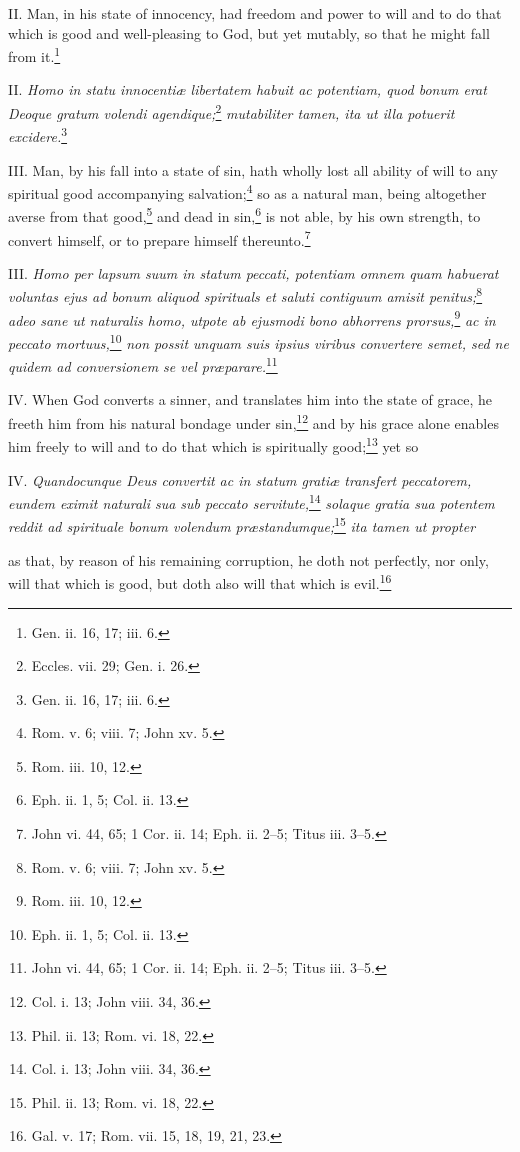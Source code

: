 II. Man, in his state of innocency, had freedom and power to will and to do that which is good and well-pleasing to God, but yet mutably, so that he might fall from it.\footnote{Gen. ii. 16, 17; iii. 6.}

II. \emph{Homo in statu innocentiæ libertatem habuit ac potentiam, quod bonum erat Deoque gratum volendi agendique;}\footnote{Eccles. vii. 29; Gen. i. 26.}\emph{ mutabiliter tamen, ita ut illa potuerit excidere.}\footnote{Gen. ii. 16, 17; iii. 6.}

III. Man, by his fall into a state of sin, hath wholly lost all ability of will to any spiritual good accompanying salvation;\footnote{Rom. v. 6; viii. 7; John xv. 5.} so as a natural man, being altogether averse from that good,\footnote{Rom. iii. 10, 12.} and dead in sin,\footnote{Eph. ii. 1, 5; Col. ii. 13.} is not able, by his own strength, to convert himself, or to prepare himself thereunto.\footnote{John vi. 44, 65; 1 Cor. ii. 14; Eph. ii. 2–5; Titus iii. 3–5.}

III. \emph{Homo per lapsum suum in statum peccati, potentiam omnem quam habuerat voluntas ejus ad bonum aliquod spirituals et saluti contiguum amisit penitus;}\footnote{Rom. v. 6; viii. 7; John xv. 5.}\emph{ adeo sane ut naturalis homo, utpote ab ejusmodi bono abhorrens prorsus,}\footnote{Rom. iii. 10, 12.}\emph{ ac in peccato mortuus,}\footnote{Eph. ii. 1, 5; Col. ii. 13.}\emph{ non possit unquam suis ipsius viribus convertere semet, sed ne quidem ad conversionem se vel præparare.}\footnote{John vi. 44, 65; 1 Cor. ii. 14; Eph. ii. 2–5; Titus iii. 3–5.}

IV. When God converts a sinner, and translates him into the state of grace, he freeth him from his natural bondage under sin,\footnote{Col. i. 13; John viii. 34, 36.} and by his grace alone enables him freely to will and to do that which is spiritually good;\footnote{Phil. ii. 13; Rom. vi. 18, 22.} yet so

IV. \emph{Quandocunque Deus convertit ac in statum gratiæ transfert peccatorem, eundem eximit naturali sua sub peccato servitute,}\footnote{Col. i. 13; John viii. 34, 36.}\emph{ solaque gratia sua potentem reddit ad spirituale bonum volendum præstandumque;}\footnote{Phil. ii. 13; Rom. vi. 18, 22.}\emph{ ita tamen ut propter }

as that, by reason of his remaining corruption, he doth not perfectly, nor only, will that which is good, but doth also will that which is evil.\footnote{Gal. v. 17; Rom. vii. 15, 18, 19, 21, 23.}


